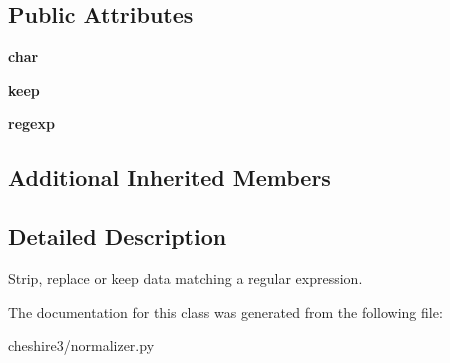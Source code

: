 \subsection*{Public Attributes}
\begin{DoxyCompactItemize}
\item 
\hypertarget{classcheshire3_1_1normalizer_1_1_regexp_normalizer_a0e1a51a6aaab125eec4b7aea56964561}{{\bfseries char}}\label{classcheshire3_1_1normalizer_1_1_regexp_normalizer_a0e1a51a6aaab125eec4b7aea56964561}

\item 
\hypertarget{classcheshire3_1_1normalizer_1_1_regexp_normalizer_a6e2ca4b98108d3def274aa0bfb34d999}{{\bfseries keep}}\label{classcheshire3_1_1normalizer_1_1_regexp_normalizer_a6e2ca4b98108d3def274aa0bfb34d999}

\item 
\hypertarget{classcheshire3_1_1normalizer_1_1_regexp_normalizer_a714c0e6278818947d7796056707633df}{{\bfseries regexp}}\label{classcheshire3_1_1normalizer_1_1_regexp_normalizer_a714c0e6278818947d7796056707633df}

\end{DoxyCompactItemize}
\subsection*{Additional Inherited Members}


\subsection{Detailed Description}
\begin{DoxyVerb}Strip, replace or keep data matching a regular expression.\end{DoxyVerb}
 

The documentation for this class was generated from the following file\-:\begin{DoxyCompactItemize}
\item 
cheshire3/normalizer.\-py\end{DoxyCompactItemize}
